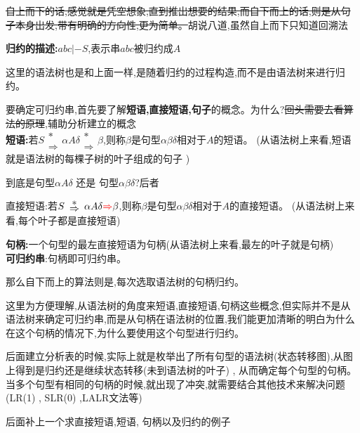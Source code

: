 \sout{自上而下的话,感觉就是凭空想象,直到推出想要的结果,而自下而上的话,则是从句子本身出发,带有明确的方向性,更为简单。}胡说八道,虽然自上而下只知道回溯法

\textbf{归约的描述:}$abc|-S$,表示串$abc$被归约成$A$

这里的语法树也是和上面一样,是随着归约的过程构造,而不是由语法树来进行归约。

\spaceline
要确定可归约串,首先要了解\textbf{短语,直接短语,句子}的概念。{\color{red}为什么?\sout{回头需要去看算法的原理},辅助分析建立的概念}\\
\textbf{短语:}若$\renewcommand{\arraystretch}{0.5}S\begin{array}{c} * \\ \Rightarrow \end{array} \alpha A\delta
 \begin{array}{c} * \\ \Rightarrow \end{array} \beta$,则称$\beta$是句型{\color{red}$\alpha \beta \delta$}相对于$A$的短语。
(从语法树上来看,短语就是语法树的每棵子树的叶子组成的句子 )

{\color{blue}到底是句型$\alpha A \delta$ 还是 句型$\alpha \beta \delta$?后者}

直接短语:若$\renewcommand{\arraystretch}{0.5}S\begin{array}{c} * \\ \Rightarrow \end{array} \alpha A\delta
 {\color{red}\Rightarrow}  \beta$,则称$\beta$是句型{\color{red}$\alpha \beta \delta$}相对于$A$的直接短语。
(从语法树上来看,每个叶子都是直接短语)

\textbf{句柄:}一个句型的最左直接短语为句柄(从语法树上来看,最左的叶子就是句柄)\\
\textbf{可归约串}:句柄即可归约串。

那么自下而上的算法则是,每次选取语法树的句柄归约。

这里为方便理解,从语法树的角度来短语,直接短语,句柄这些概念,但实际并不是从语法树来确定可归约串,而是从句柄在语法树的位置,我们能更加清晰的明白为什么在这个句柄的情况下,为什么要使用这个句型进行归约。

后面建立分析表的时候,实际上就是枚举出了所有句型的语法树(状态转移图),从图上得到是归约还是继续状态转移(未到语法树的叶子) , 从而确定每个句型的句柄。当多个句型有相同的句柄的时候,就出现了冲突,就需要结合其他技术来解决问题(LR(1) , SLR(0) ,LALR文法等)

{\color{red} 后面补上一个求直接短语,短语, 句柄以及归约的例子}

